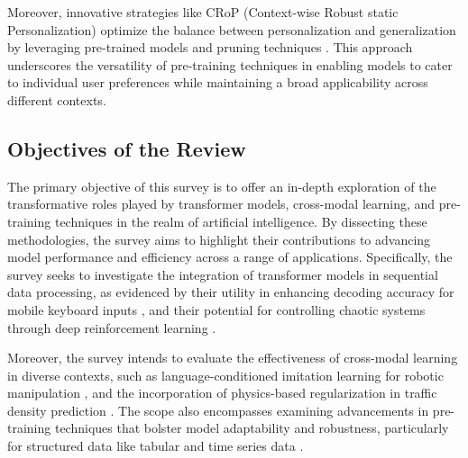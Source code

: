 Moreover, innovative strategies like CRoP (Context-wise Robust static Personalization) optimize the balance between personalization and generalization by leveraging pre-trained models and pruning techniques \cite{kaur2024cropcontextwiserobuststatic}. This approach underscores the versatility of pre-training techniques in enabling models to cater to individual user preferences while maintaining a broad applicability across different contexts.







\subsection{Objectives of the Review} \label{subsec:Objectives of the Review}

The primary objective of this survey is to offer an in-depth exploration of the transformative roles played by transformer models, cross-modal learning, and pre-training techniques in the realm of artificial intelligence. By dissecting these methodologies, the survey aims to highlight their contributions to advancing model performance and efficiency across a range of applications. Specifically, the survey seeks to investigate the integration of transformer models in sequential data processing, as evidenced by their utility in enhancing decoding accuracy for mobile keyboard inputs \cite{ouyang2017mobilekeyboardinputdecoding}, and their potential for controlling chaotic systems through deep reinforcement learning \cite{vashishtha2019restoringchaosusingdeep}.



Moreover, the survey intends to evaluate the effectiveness of cross-modal learning in diverse contexts, such as language-conditioned imitation learning for robotic manipulation \cite{zhou2024languageconditionedimitationlearningbase}, and the incorporation of physics-based regularization in traffic density prediction \cite{thodi2023fourierneuraloperatorlearning}. The scope also encompasses examining advancements in pre-training techniques that bolster model adaptability and robustness, particularly for structured data like tabular and time series data \cite{koo2023comprehensivesurveygenerativediffusion}.



